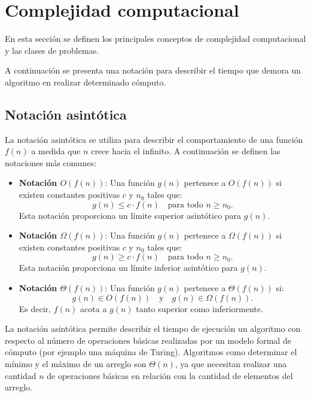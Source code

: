 \section{Complejidad computacional}

En esta sección se definen los principales conceptos de complejidad computacional y las clases de problemas.

A continuación se presenta una notación para describir el tiempo que demora un algoritmo en realizar determinado cómputo.

\subsection{Notación asintótica}

La notación asintótica se utiliza para describir el comportamiento de una función $f(n)$ a medida que $n$ crece hacia el infinito. A continuación se definen las notaciones más comunes:

\begin{itemize}
      \item \textbf{Notación $O(f(n))$}: Una función $g(n)$ pertenece a $O(f(n))$ si existen constantes positivas $c$ y $n_0$ tales que:
            \[
                  g(n) \leq c \cdot f(n) \quad \text{para todo } n \geq n_0.
            \]
            Esta notación proporciona un límite superior asintótico para $g(n)$.
            
      \item \textbf{Notación $\Omega(f(n))$}: Una función $g(n)$ pertenece a $\Omega(f(n))$ si existen constantes positivas $c$ y $n_0$ tales que:
            \[
                  g(n) \geq c \cdot f(n) \quad \text{para todo } n \geq n_0.
            \]
            Esta notación proporciona un límite inferior asintótico para $g(n)$.
            
      \item \textbf{Notación $\Theta(f(n))$}: Una función $g(n)$ pertenece a $\Theta(f(n))$ si:
            \[
                  g(n) \in O(f(n)) \quad \text{y} \quad g(n) \in \Omega(f(n)).
            \]
            Es decir, $f(n)$ acota a $g(n)$ tanto superior como inferiormente.
\end{itemize}

La notación asintótica permite describir el tiempo de ejecución un algoritmo con respecto al número de operaciones 
básicas realizadas por un modelo formal de cómputo (por ejemplo una máquina de Turing). Algoritmos como determinar el mínimo y el máximo de
un arreglo son $\Theta(n)$, ya que necesitan realizar una cantidad $n$ de operaciones básicas en relación con
la cantidad de elementos del arreglo.

